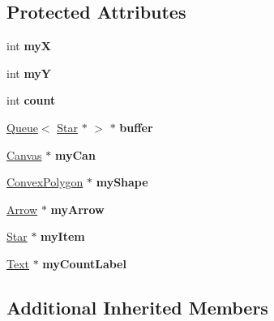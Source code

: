 \subsection*{Protected Attributes}
\begin{DoxyCompactItemize}
\item 
\mbox{\label{class_p_c_thread_ae2b90159f35617ed516678314db7e7bd}} 
int {\bfseries myX}
\item 
\mbox{\label{class_p_c_thread_a604e02565566f31468557ca79a610164}} 
int {\bfseries myY}
\item 
\mbox{\label{class_p_c_thread_a8107e048d3340e5cb40af9ed613f4c20}} 
int {\bfseries count}
\item 
\mbox{\label{class_p_c_thread_aeabf35c11ce3b710a8a77a1f8668a566}} 
\hyperlink{class_queue}{Queue}$<$ \hyperlink{classtsgl_1_1_star}{Star} $\ast$ $>$ $\ast$ {\bfseries buffer}
\item 
\mbox{\label{class_p_c_thread_af9e9d19ab5bf1270941196546953a8f1}} 
\hyperlink{classtsgl_1_1_canvas}{Canvas} $\ast$ {\bfseries my\+Can}
\item 
\mbox{\label{class_p_c_thread_add7f6d91944182daddcc3046fe3888dc}} 
\hyperlink{classtsgl_1_1_convex_polygon}{Convex\+Polygon} $\ast$ {\bfseries my\+Shape}
\item 
\mbox{\label{class_p_c_thread_a07bd5b9a44cd4cf624926cb98ee31be2}} 
\hyperlink{classtsgl_1_1_arrow}{Arrow} $\ast$ {\bfseries my\+Arrow}
\item 
\mbox{\label{class_p_c_thread_a3ca420c0690790d3c3fbd2e180f0ce15}} 
\hyperlink{classtsgl_1_1_star}{Star} $\ast$ {\bfseries my\+Item}
\item 
\mbox{\label{class_p_c_thread_a2b37315ff24869556be743aea49def26}} 
\hyperlink{classtsgl_1_1_text}{Text} $\ast$ {\bfseries my\+Count\+Label}
\end{DoxyCompactItemize}
\subsection*{Additional Inherited Members}



